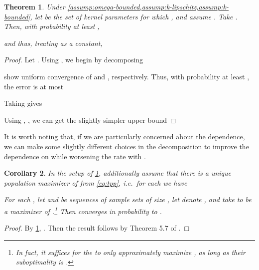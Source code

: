 \documentclass{article}
\newtheorem{theorem}{Theorem} \crefname{theorem}{Theorem}{Theorems}
\newtheorem{corollary}[theorem]{Corollary} \crefname{corollary}{Corollary}{Corollaries}
\begin{document}
\begin{theorem} \label{thm:ratio-conv}
Under \cref{assump:omega-bounded,assump:k-lipschitz,assump:k-bounded},
let  be the set of kernel parameters for which ,
and assume .
Take .
Then, with probability at least ,

and thus, treating  as a constant,


\end{theorem}
\begin{proof}
Let .
Using ,
we begin by decomposing

 show uniform convergence of  and , respectively.
Thus, with probability at least ,
the error is at most

Taking  gives

Using , ,
we can get the slightly simpler upper bound

\end{proof}
It is worth noting that, if we are particularly concerned about the  dependence,
we can make some slightly different choices in the decomposition to improve the dependence on  while worsening the rate with .

\begin{corollary} \label{thm:param-conv}
In the setup of \cref{thm:ratio-conv},
additionally assume that there is a unique population maximizer  of  from \eqref{eq:tpp},
i.e.\ for each  we have

For each ,
let  and  be sequences of sample sets of size ,
let  denote ,
and take  to be a maximizer of .\footnote{In fact, it suffices for the  to only approximately maximize , as long as their suboptimality is .}{}
Then  converges in probability to .
\end{corollary}
\begin{proof}
By \cref{thm:ratio-conv},
.
Then the result follows by Theorem 5.7 of \citet{van2000asymptotic}.
\end{proof}
\end{document}
